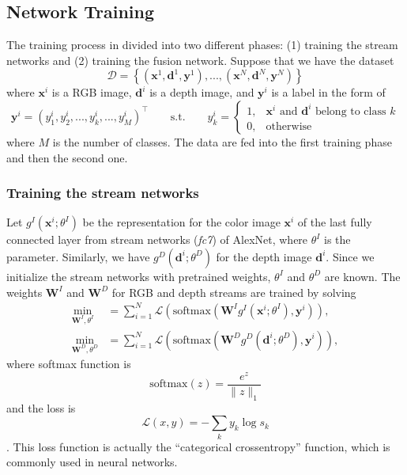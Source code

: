 \subsection{Network Training}
The training process in divided into two different phases: (1) training the stream networks and (2) training the fusion network. Suppose that we have the dataset
\[ \mathcal{D} = \left\{ \left(\mathbf{x}^1, \mathbf{d}^1, \mathbf{y}^1\right), ..., \left(\mathbf{x}^N, \mathbf{d}^N, \mathbf{y}^N\right) \right\} \]
where $\mathbf{x}^i$ is a RGB image, $\mathbf{d}^i$ is a depth image, and $\mathbf{y}^i$ is a label in the form of
\[
\mathbf{y}^i = (y_1^i, y_2^i, ..., y_k^i, ..., y_{M}^i)^\top \qquad \text{s.t.} \qquad y_k^i = 
\begin{cases}
1, & \mathbf{x}^i \text{ and } \mathbf{d}^i \text{ belong to class } k\\
0, & \text{otherwise}
\end{cases}
\]
where $M$ is the number of classes. The data are fed into the first training phase and then the second one.

\subsubsection{Training the stream networks}
Let $g^I(\mathbf{x}^i; \theta^I)$ be the representation for the color image $\mathbf{x}^i$ of the last fully connected layer from stream networks (\textit{fc7}) of AlexNet, where $\theta^I$ is the parameter. Similarly, we have $g^D(\mathbf{d}^i; \theta^D)$ for the depth image $\mathbf{d}^i$. Since we initialize the stream networks with pretrained weights, $\theta^I$ and $\theta^D$ are known. The weights $\mathbf{W}^I$ and $\mathbf{W}^D$ for RGB and depth streams are trained by solving
\begin{align*}
	\min_{\mathbf{W}^I,\theta^I} &= \sum_{i=1}^N \mathcal{L} \left( \text{softmax}\left(\mathbf{W}^I g^I \left(\mathbf{x}^i; \theta^I\right), \mathbf{y}^i\right)\right), \\
	\min_{\mathbf{W}^D,\theta^D} &= \sum_{i=1}^N \mathcal{L} \left( \text{softmax}\left(\mathbf{W}^D g^D \left(\mathbf{d}^i; \theta^D\right), \mathbf{y}^i\right)\right),
\end{align*}
where softmax function is
\[ \text{softmax}(z) =\frac{e^z}{\lVert z \rVert_1} \]
and the loss is
\[ \mathcal{L}(x,y) = -\sum_k y_k \log s_k \].
This loss function is actually the ``categorical crossentropy'' function, which is commonly used in neural networks.

